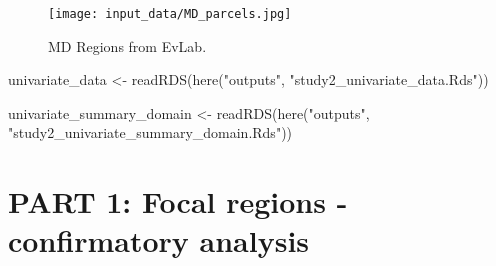 \documentclass[
]{article}
\newenvironment{Shaded}{\begin{snugshade}}{\end{snugshade}}
\newcommand{\DecValTok}[1]{\textcolor[rgb]{0.00,0.00,0.81}{#1}}
\newcommand{\FunctionTok}[1]{\textcolor[rgb]{0.00,0.00,0.00}{#1}}
\newcommand{\NormalTok}[1]{#1}
\newcommand{\OtherTok}[1]{\textcolor[rgb]{0.56,0.35,0.01}{#1}}
\newcommand{\SpecialCharTok}[1]{\textcolor[rgb]{0.00,0.00,0.00}{#1}}
\newcommand{\StringTok}[1]{\textcolor[rgb]{0.31,0.60,0.02}{#1}}
\begin{document}
\begin{figure}
\centering
\texttt{[image: input\_data/MD\_parcels.jpg]}
\caption{MD Regions from EvLab.}
\end{figure}

\begin{Shaded}
\begin{Highlighting}[]
\NormalTok{univariate\_data }\OtherTok{\textless{}{-}}
  \FunctionTok{readRDS}\NormalTok{(}\FunctionTok{here}\NormalTok{(}\StringTok{"outputs"}\NormalTok{, }\StringTok{"study2\_univariate\_data.Rds"}\NormalTok{))}

\NormalTok{univariate\_summary\_domain }\OtherTok{\textless{}{-}}
  \FunctionTok{readRDS}\NormalTok{(}\FunctionTok{here}\NormalTok{(}\StringTok{"outputs"}\NormalTok{, }\StringTok{"study2\_univariate\_summary\_domain.Rds"}\NormalTok{))}
\end{Highlighting}
\end{Shaded}

\hypertarget{part-1-focal-regions---confirmatory-analysis}{%
\section{PART 1: Focal regions - confirmatory
analysis}\label{part-1-focal-regions---confirmatory-analysis}}

\begin{Shaded}
\end{Shaded}
\end{document}
